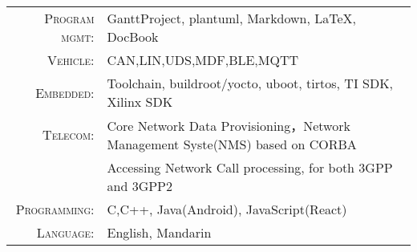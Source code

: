 %
%


 
\renewcommand{\arraystretch}{1.1}

	\begin{tabular}{>{}r>{}p{13cm}} 
		\textsc{Program mgmt:}	   & GanttProject, plantuml, Markdown, LaTeX, DocBook \\
		\textsc{Vehicle:}	   & CAN,LIN,UDS,MDF,BLE,MQTT \\
		\textsc{Embedded:}	   & Toolchain, buildroot/yocto, uboot, tirtos, TI SDK, Xilinx SDK  \\		
		\textsc{Telecom:} 		   & Core Network Data Provisioning，Network Management Syste(NMS) based on CORBA\\
							   & Accessing Network Call processing, for both 3GPP and 3GPP2 \\
		\textsc{Programming:}      & C,C++, Java(Android), JavaScript(React)\\  
		\textsc{Language:}	    &  English, Mandarin  \\
	\end{tabular}
	

